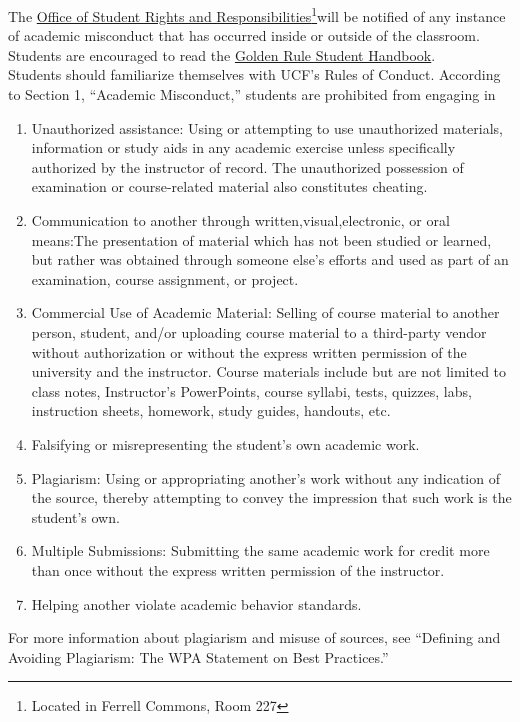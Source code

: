 \documentclass[11pt]{paper}
\begin{document}
The \href{https://osrr.sdes.ucf.edu/}{Office of Student Rights and Responsibilities}\footnote{Located in Ferrell Commons, Room 227}will be notified of any instance of academic misconduct that has occurred inside or outside of the classroom. Students are encouraged to read the \href{https://goldenrule.sdes.ucf.edu/}{Golden Rule Student Handbook}.\\

Students should familiarize themselves with UCF’s Rules of Conduct. According to Section 1, ``Academic Misconduct,'' students are prohibited from engaging in
\begin{enumerate}
\item Unauthorized assistance: Using or attempting to use unauthorized materials, information or study aids in any academic exercise unless specifically authorized by the instructor of record. The unauthorized possession of examination or course-related material also constitutes cheating.
\item Communication to another through written,visual,electronic, or oral means:The presentation of material which has not been studied or learned, but rather was obtained through someone else’s efforts and used as part of an examination, course assignment, or project.
\item Commercial Use of Academic Material: Selling of course material to another person, student, and/or uploading course material to a third-party vendor without authorization or without the express written permission of the university and the instructor. Course materials include but are not limited to class notes, Instructor’s PowerPoints, course syllabi, tests, quizzes, labs, instruction sheets, homework, study guides, handouts, etc.
\item Falsifying or misrepresenting the student’s own academic work.
\item Plagiarism: Using or appropriating another’s work without any indication of the source, thereby attempting to convey the impression that such work is the student’s own.
\item Multiple Submissions: Submitting the same academic work for credit more than once without the express written permission of the instructor.
\item Helping another violate academic behavior standards.
\end{enumerate}
For more information about plagiarism and misuse of sources, see ``Defining and Avoiding Plagiarism: The WPA Statement on Best Practices.''\\
\end{document}
